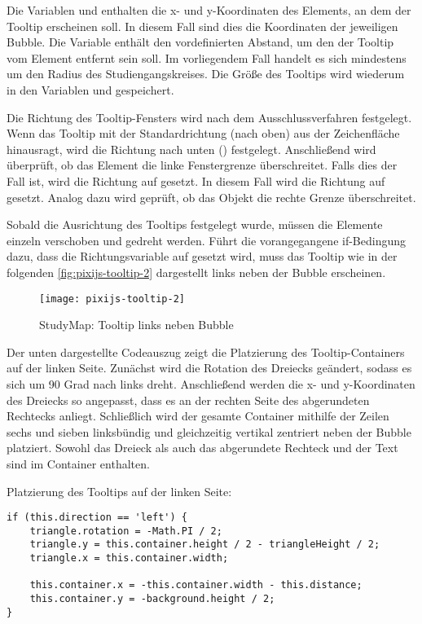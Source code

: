 Die Variablen  und  enthalten die x- und y-Koordinaten des Elements, an dem der Tooltip erscheinen soll. In diesem Fall sind dies die Koordinaten der jeweiligen Bubble. Die Variable  enthält den vordefinierten Abstand, um den der Tooltip vom Element entfernt sein soll. Im vorliegendem Fall handelt es sich mindestens um den Radius des Studiengangskreises. Die Größe des Tooltips wird wiederum in den Variablen  und  gespeichert.

Die Richtung des Tooltip-Fensters wird nach dem Ausschlussverfahren festgelegt. Wenn das Tooltip mit der Standardrichtung  (nach oben) aus der Zeichenfläche hinausragt, wird die Richtung nach unten () festgelegt. Anschließend wird überprüft, ob das Element die linke Fenstergrenze überschreitet. Falls dies der Fall ist, wird die Richtung auf  gesetzt. In diesem Fall wird die Richtung auf  gesetzt. Analog dazu wird geprüft, ob das Objekt die rechte Grenze überschreitet.

Sobald die Ausrichtung des Tooltips festgelegt wurde, müssen die Elemente einzeln verschoben und gedreht werden. Führt die vorangegangene if-Bedingung dazu, dass die Richtungsvariable  auf  gesetzt wird, muss das Tooltip wie in der folgenden \autoref{fig:pixijs-tooltip-2} dargestellt links neben der Bubble erscheinen.

\begin{figure}[H]
    \centering
    \texttt{[image: pixijs-tooltip-2]}
    \caption{StudyMap: Tooltip links neben Bubble}
    \label{fig:pixijs-tooltip-2}
\end{figure}

Der unten dargestellte Codeauszug zeigt die Platzierung des Tooltip-Containers auf der linken Seite. Zunächst wird die Rotation des Dreiecks geändert, sodass es sich um 90 Grad nach links dreht. Anschließend werden die x- und y-Koordinaten des Dreiecks so angepasst, dass es an der rechten Seite des abgerundeten Rechtecks anliegt. Schließlich wird der gesamte Container mithilfe der Zeilen sechs und sieben linksbündig und gleichzeitig vertikal zentriert neben der Bubble platziert. Sowohl das Dreieck als auch das abgerundete Rechteck und der Text sind im Container enthalten.

\noindent
Platzierung des Tooltips auf der linken Seite:
\begin{lstlisting}[style=Python]
if (this.direction == 'left') {
    triangle.rotation = -Math.PI / 2;
    triangle.y = this.container.height / 2 - triangleHeight / 2;
    triangle.x = this.container.width;

    this.container.x = -this.container.width - this.distance;
    this.container.y = -background.height / 2;
}
\end{lstlisting}

